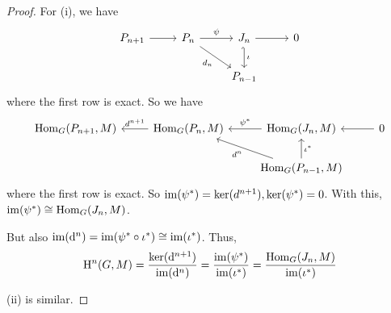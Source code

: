 \documentclass{article}
\begin{document}
\begin{proof}
    For (i), we have
\[\begin{tikzcd}
	{P_{n+1}} & {P_n} & {J_n} & 0 \\
	&& {P_{n-1}}
	\arrow[from=1-1, to=1-2]
	\arrow["\psi", from=1-2, to=1-3]
	\arrow[from=1-3, to=1-4]
	\arrow["{d_n}"', from=1-2, to=2-3]
	\arrow["\iota", hook', from=1-3, to=2-3]
\end{tikzcd}\]
    where the first row is exact. So we have
\[\begin{tikzcd}
	{\Hom_G(P_{n+1},M)} & {\Hom_G(P_n, M)} & {\Hom_G(J_n,M)} & 0 \\
	&& {\Hom_G(P_{n-1},M)}
	\arrow[from=1-4, to=1-3]
	\arrow["{\psi^*}"', from=1-3, to=1-2]
	\arrow["{d^{n+1}}"', from=1-2, to=1-1]
	\arrow["{d^n}", from=2-3, to=1-2]
	\arrow["{\iota^*}"', from=2-3, to=1-3]
\end{tikzcd}\]
    where the first row is exact. So \(\operatorname{im}(\psi^*) = \ker(d^{n+1}), \ker(\psi^*) = 0\). With this, \(\operatorname{im}(\psi^*) \cong \operatorname{Hom}_G(J_n, M)\).

    But also \(\operatorname{im}(\dd^n) = \operatorname{im}(\psi^* \circ \iota^*) \cong \operatorname{im}(\iota^*)\). Thus,
    \[\mathrm{H}^n(G, M) = \frac{\ker(\dd^{n+1})}{\operatorname{im}(\dd^n)} = \frac{\operatorname{im}(\psi^*)}{\operatorname{im}(\iota^*)} = \frac{\operatorname{Hom}_G(J_n, M)}{\operatorname{im}(\iota^*)}\]

    (ii) is similar.
\end{proof}
\end{document}
